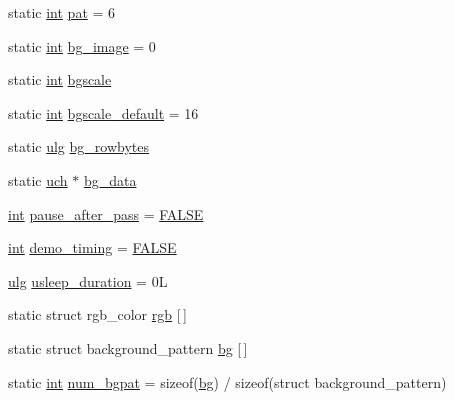 \begin{DoxyCompactItemize}
static \mbox{\hyperlink{ioapi_8h_a787fa3cf048117ba7123753c1e74fcd6}{int}} \mbox{\hyperlink{rpng2-x_8c_a0e13c5b1758f3abeec1855394c921107}{pat}} = 6
\item 
static \mbox{\hyperlink{ioapi_8h_a787fa3cf048117ba7123753c1e74fcd6}{int}} \mbox{\hyperlink{rpng2-x_8c_a1f95a8a8bfcf398fe6d4b23eb958f064}{bg\+\_\+image}} = 0
\item 
static \mbox{\hyperlink{ioapi_8h_a787fa3cf048117ba7123753c1e74fcd6}{int}} \mbox{\hyperlink{rpng2-x_8c_ab2bd2b176aeae12a23126f93e3ccab33}{bgscale}}
\item 
static \mbox{\hyperlink{ioapi_8h_a787fa3cf048117ba7123753c1e74fcd6}{int}} \mbox{\hyperlink{rpng2-x_8c_afbdec83022903cd491403d2faae5e38a}{bgscale\+\_\+default}} = 16
\item 
static \mbox{\hyperlink{readpng_8h_abd6f60bf9450af2ecb94097a32c19a64}{ulg}} \mbox{\hyperlink{rpng2-x_8c_a87b93a760b02367b4454818bce11ac88}{bg\+\_\+rowbytes}}
\item 
static \mbox{\hyperlink{readpng_8h_af3307af5922c72924a837559c801a8a4}{uch}} $\ast$ \mbox{\hyperlink{rpng2-x_8c_ae7b1caf5caf0f274b142e9792622dac4}{bg\+\_\+data}}
\item 
\mbox{\hyperlink{ioapi_8h_a787fa3cf048117ba7123753c1e74fcd6}{int}} \mbox{\hyperlink{rpng2-x_8c_afb2f62a163496d342d914e18bdb28554}{pause\+\_\+after\+\_\+pass}} = \mbox{\hyperlink{pnm2png_8c_aa93f0eb578d23995850d61f7d61c55c1}{F\+A\+L\+SE}}
\item 
\mbox{\hyperlink{ioapi_8h_a787fa3cf048117ba7123753c1e74fcd6}{int}} \mbox{\hyperlink{rpng2-x_8c_ae852c2333fbe5ff435d0f120e36bd657}{demo\+\_\+timing}} = \mbox{\hyperlink{pnm2png_8c_aa93f0eb578d23995850d61f7d61c55c1}{F\+A\+L\+SE}}
\item 
\mbox{\hyperlink{readpng_8h_abd6f60bf9450af2ecb94097a32c19a64}{ulg}} \mbox{\hyperlink{rpng2-x_8c_acdb3a6fad912cfd36518b01be3c90753}{usleep\+\_\+duration}} = 0L
\item 
static struct rgb\+\_\+color \mbox{\hyperlink{rpng2-x_8c_a3640ea0c70d52a4d9bb9b79008e91dc5}{rgb}} \mbox{[}$\,$\mbox{]}
\item 
static struct background\+\_\+pattern \mbox{\hyperlink{rpng2-x_8c_a808fa6d3573a86afa3ba7698a65b1ef6}{bg}} \mbox{[}$\,$\mbox{]}
\item 
static \mbox{\hyperlink{ioapi_8h_a787fa3cf048117ba7123753c1e74fcd6}{int}} \mbox{\hyperlink{rpng2-x_8c_af61b351338b26840386fbab7f8214e53}{num\+\_\+bgpat}} = sizeof(\mbox{\hyperlink{rpng2-x_8c_a808fa6d3573a86afa3ba7698a65b1ef6}{bg}}) / sizeof(struct background\+\_\+pattern)
\item 

\end{DoxyCompactItemize}
